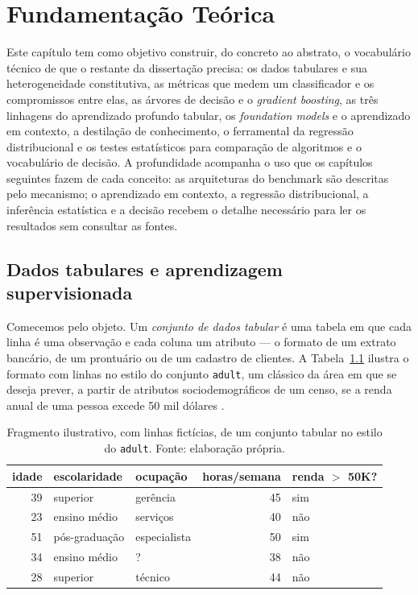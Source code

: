 \chapter{Fundamentação Teórica}
\label{chap:fundamentacao}

Este capítulo tem como objetivo construir, do concreto ao abstrato, o
vocabulário técnico de que o restante da dissertação precisa: os dados
tabulares e sua heterogeneidade constitutiva, as métricas que medem um
classificador e os compromissos entre elas, as árvores de decisão e o
\emph{gradient boosting}, as três linhagens do aprendizado profundo
tabular, os \emph{foundation models} e o aprendizado em contexto, a
destilação de conhecimento, o ferramental da regressão distribucional e
os testes estatísticos para comparação de algoritmos e o vocabulário
de decisão. A profundidade acompanha o uso que os capítulos seguintes
fazem de cada conceito: as arquiteturas do benchmark são descritas
pelo mecanismo; o aprendizado em contexto, a regressão distribucional,
a inferência estatística e a decisão recebem o detalhe necessário para
ler os resultados sem consultar as fontes.

\section{Dados tabulares e aprendizagem supervisionada}
\label{sec:fund-tabular}

Comecemos pelo objeto. Um \emph{conjunto de dados tabular} é uma tabela em
que cada linha é uma observação e cada coluna um atributo --- o formato de
um extrato bancário, de um prontuário ou de um cadastro de clientes. A
Tabela~\ref{tab:adult-exemplo} ilustra o formato com linhas no estilo do
conjunto \texttt{adult}, um clássico da área em que se deseja prever, a
partir de atributos sociodemográficos de um censo, se a renda anual de uma
pessoa excede 50 mil dólares \citep{kohavi1996}.

\begin{table}[htb]
\centering
\caption[Fragmento ilustrativo de conjunto tabular]{Fragmento ilustrativo, com linhas fictícias, de um conjunto
tabular no estilo do \texttt{adult}. Fonte: elaboração própria.}
\label{tab:adult-exemplo}
\begin{tabular}{rllrl}
\toprule
idade & escolaridade & ocupação & horas/semana & renda $>$ 50K? \\
\midrule
39 & superior        & gerência        & 45 & sim \\
23 & ensino médio    & serviços        & 40 & não \\
51 & pós-graduação   & especialista    & 50 & sim \\
34 & ensino médio    & ?               & 38 & não \\
28 & superior        & técnico         & 44 & não \\
\bottomrule
\end{tabular}
\end{table}


